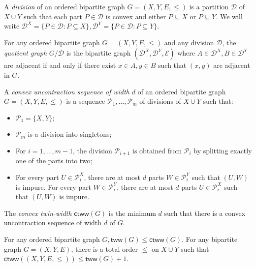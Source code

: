 \documentclass{theoretics}
\newcommand{\cD}{\ensuremath{\mathcal{D}}}
\newcommand{\cE}{\ensuremath{\mathcal{E}}}
\newcommand{\cP}{\ensuremath{\mathcal{P}}}
\newcommand{\tw}{\mathsf{tww}}
\begin{document}
\begin{definition}[Division]
A \emph{division} of an ordered bipartite graph $G = (X,Y,E,\leq)$ is a partition $\cD$ of $X \cup
Y$ such that each part $P \in \cD$ is convex and either $P \subseteq X$ or $P \subseteq Y$. We will
write $\cD^X = \{ P \in \cD : P \subseteq X \}, \cD^Y = \{ P \in \cD : P \subseteq Y \}$.
\end{definition}

\begin{definition}
For any ordered bipartite graph $G = (X,Y,E, \leq)$ and any division $\cD$, the \emph{quotient graph}
$G/\cD$ is the bipartite graph $(\cD^X, \cD^Y, \cE)$ where $A \in \cD^X, B \in \cD^Y$ are
adjacent if and only if there exist $x \in A, y \in B$ such that $(x,y)$ are adjacent in $G$.
\end{definition}


\newcommand{\ctw}{\mathsf{ctww}}
\begin{definition}
A \emph{convex uncontraction sequence of width $d$} of an ordered bipartite graph $G = (X,Y,E,\leq)$
is a sequence $\cP_1, \dotsc, \cP_m$ of divisions of $X \cup Y$ such that:
\begin{itemize}
\item $\cP_1 = \{ X, Y \}$;
\item $\cP_m$ is a division into singletons;
\item For $i = 1, \dotsc, m-1$, the division $\cP_{i+1}$ is obtained from $\cP_i$ by splitting
exactly one of the parts into two;
\item For every part $U \in \cP_i^X$, there are at most $d$ parts $W \in \cP_i^Y$ such that $(U,W)$
is impure. For every part $W \in \cP_i^Y$, there are at most $d$ parts $U \in \cP_i^X$ such that
$(U,W)$ is impure.
\end{itemize}
The \emph{convex twin-width} $\ctw(G)$ is the minimum $d$ such that there is a convex uncontraction
sequence of width $d$ of $G$.
\end{definition}

\begin{lemma}
\label{lemma:convex twin width}
For any ordered bipartite graph $G, \tw(G) \leq \ctw(G)$. For any bipartite graph $G = (X,Y,E)$,
there is a total order $\leq$ on $X \cup Y$ such that $\ctw((X,Y,E,{\leq})) \leq \tw(G)+1$.
\end{lemma}
\end{document}
